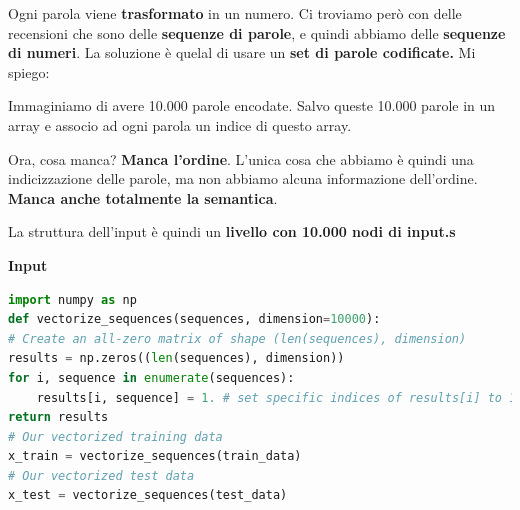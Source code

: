 Ogni parola viene \textbf{trasformato} in un numero. Ci troviamo però con delle
recensioni che sono delle \textbf{sequenze di parole}, e quindi abbiamo delle
\textbf{sequenze di numeri}. La soluzione è quelal di usare un \textbf{set di
    parole codificate.} Mi spiego:

Immaginiamo di avere 10.000 parole encodate. Salvo queste 10.000 parole in un
array e associo ad ogni parola un indice di questo array.

\begin{figure}[H]
    \begin{center}

    \end{center}
\end{figure}

Ora, cosa manca? \textbf{Manca l'ordine}. L'unica cosa che abbiamo è quindi una
indicizzazione delle parole, ma non abbiamo alcuna informazione dell'ordine.
\textbf{Manca anche totalmente la semantica}.

La struttura dell'input è quindi un \textbf{livello con 10.000 nodi di input.s}

\textbf{Input}
\begin{lstlisting}[language=Python]
import numpy as np
def vectorize_sequences(sequences, dimension=10000):
# Create an all-zero matrix of shape (len(sequences), dimension)
results = np.zeros((len(sequences), dimension))
for i, sequence in enumerate(sequences):
    results[i, sequence] = 1. # set specific indices of results[i] to 1s
return results
# Our vectorized training data
x_train = vectorize_sequences(train_data)
# Our vectorized test data
x_test = vectorize_sequences(test_data)

\end{lstlisting}

